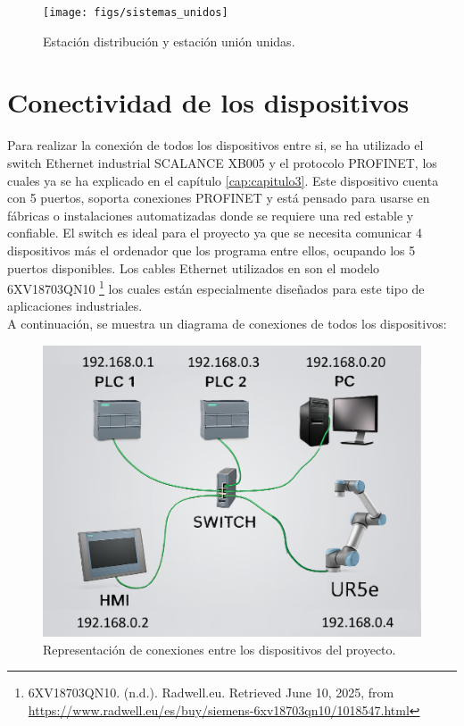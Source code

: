 \clearpage

\begin{figure}[h!]
  \begin{center}
    \texttt{[image: figs/sistemas\_unidos]}
  \end{center}
  \caption{\centering Estación distribución y estación unión unidas.}
  \label{fig:sistemas_unidos}
\end{figure}


\section{Conectividad de los dispositivos}
\label{sec:conectividad_dispositivos}

Para realizar la conexión de todos los dispositivos entre si, se ha utilizado el switch Ethernet industrial SCALANCE XB005 y el protocolo PROFINET, los cuales ya se ha explicado en el capítulo \ref{cap:capitulo3}. Este dispositivo cuenta con 5 puertos, soporta conexiones PROFINET y está pensado para usarse en fábricas o instalaciones automatizadas donde se requiere una red estable y confiable. El switch es ideal para el proyecto ya que se necesita comunicar 4 dispositivos más el ordenador que los programa entre ellos, ocupando los 5 puertos disponibles. Los cables Ethernet utilizados en son el modelo 6XV18703QN10 \footnote{6XV18703QN10. (n.d.). Radwell.eu. Retrieved June 10, 2025, from \url{https://www.radwell.eu/es/buy/siemens-6xv18703qn10/1018547.html}} los cuales están especialmente diseñados para este tipo de aplicaciones industriales.  \\

A continuación, se muestra un diagrama de conexiones de todos los dispositivos:

\begin{figure} [h!]
  \begin{center}
    \includegraphics[width=14cm]{figs/conexion_dispositivos}
  \end{center}
  \caption{\centering Representación de conexiones entre los dispositivos del proyecto.}
  \label{fig:conexion_dispositivos}
\end{figure} 

